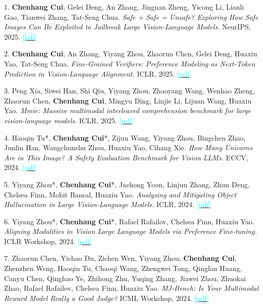 \documentclass[letterpaper,11pt]{article}
\newcommand{\resumeItem}[1]{
  \item\small{
    {#1 \vspace{-2pt}}
  }
}
\begin{document}
        \resumeItem{1. \textbf{Chenhang Cui}, Gelei Deng, An Zhang, Jingnan Zheng, Yicong Li,
        Lianli Gao, Tianwei Zhang, Tat-Seng Chua.
        \textit{Safe + Safe = Unsafe? Exploring How Safe Images Can Be Exploited to Jailbreak
        Large Vision-Language Models.}
        NeurIPS, 2025.
        \href{https://arxiv.org/pdf/2411.11496}{\textcolor{cyan}{[pdf]}}}

        \resumeItem{2. \textbf{Chenhang Cui}, An Zhang, Yiyang Zhou, Zhaorun Chen, Gelei Deng, Huaxiu Yao, Tat-Seng Chua.
        \textit{Fine-Grained Verifiers: Preference Modeling as Next-Token Prediction in Vision-Language Alignment.}
        ICLR, 2025.
        \href{https://arxiv.org/pdf/2410.14148.pdf}{\textcolor{cyan}{[pdf]}}}

        \resumeItem{3. Peng Xia, Siwei Han, Shi Qiu, Yiyang Zhou, Zhaoyang Wang, Wenhao Zheng, Zhaorun Chen, \textbf{Chenhang Cui}, Mingyu Ding, Linjie Li, Lijuan Wang, Huaxiu Yao.
        \textit{Mmie: Massive multimodal interleaved comprehension benchmark for large vision-language models.}
        ICLR, 2025.
        \href{https://arxiv.org/pdf/2410.10139}{\textcolor{cyan}{[pdf]}}}

        \resumeItem{4. Haoqin Tu*, \textbf{Chenhang Cui}*, Zijun Wang, Yiyang Zhou, Bingchen Zhao, Junlin Han, Wangchunshu Zhou, Huaxiu Yao, Cihang Xie.
        \textit{How Many Unicorns Are in This Image? A Safety Evaluation Benchmark for Vision LLMs.}
        ECCV, 2024.
        \href{https://arxiv.org/pdf/2311.16101.pdf}{\textcolor{cyan}{[pdf]}}}

        \resumeItem{5. Yiyang Zhou*, \textbf{Chenhang Cui}*, Jaehong Yoon, Linjun Zhang, Zhun Deng, Chelsea Finn, Mohit Bansal, Huaxiu Yao.
        \textit{Analyzing and Mitigating Object Hallucination in Large Vision-Language Models.}
        ICLR, 2024.
        \href{https://arxiv.org/pdf/2310.00754.pdf}{\textcolor{cyan}{[pdf]}}}

        \resumeItem{6. Yiyang Zhou*, \textbf{Chenhang Cui}*, Rafael Rafailov, Chelsea Finn, Huaxiu Yao.
        \textit{Aligning Modalities in Vision Large Language Models via Preference Fine-tuning.}
        ICLR Workshop, 2024.
        \href{https://arxiv.org/pdf/2402.11411}{\textcolor{cyan}{[pdf]}}}

        \resumeItem{7. Zhaorun Chen, Yichao Du, Zichen Wen, Yiyang Zhou, \textbf{Chenhang Cui}, Zhenzhen Weng, Haoqin Tu, Chaoqi Wang, Zhengwei Tong, Qinglan Huang, Canyu Chen, Qinghao Ye, Zhihong Zhu, Yuqing Zhang, Jiawei Zhou, Zhuokai Zhao, Rafael Rafailov, Chelsea Finn, Huaxiu Yao.
        \textit{MJ-Bench: Is Your Multimodal Reward Model Really a Good Judge?}
        ICML Workshop, 2024.
        \href{https://openreview.net/pdf?id=H6eELDnYvd}{\textcolor{cyan}{[pdf]}}}
\end{document}
